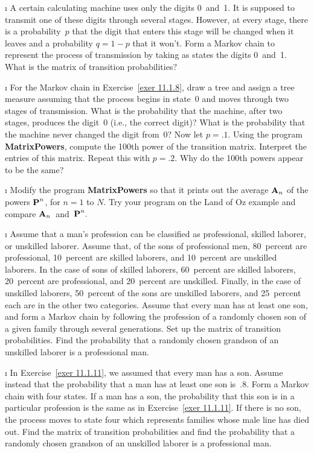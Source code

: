 \begin{LJSItem}
\i\label{exer 11.1.8} A certain calculating machine uses only the digits
0~and~1.  It is supposed to transmit one of these digits through several
stages.  However, at every stage, there is a probability~$p$ that the digit
that
enters this stage will be changed when it leaves and a probability $q = 1 - p$
that it won't.  Form a Markov chain to represent the process of transmission by
taking as states the digits 0~and~1.  What is the matrix of transition
probabilities?

\i\label{exer 11.1.9} For the Markov chain in Exercise~\ref{exer 11.1.8}, draw
a tree 
and assign a tree measure assuming that the process begins in state~0 and moves
through
two stages of transmission.  What is the probability that the machine, after
two
stages, produces the digit~0 (i.e., the correct digit)?  What is the
probability that the machine never changed the digit from~0?  Now let $p = .1$. 
Using
the program {\bf MatrixPowers}, compute the 100th power of the transition
matrix.
Interpret the entries of this matrix.  Repeat this with $p = .2$.  Why do the
100th
powers appear to be the same?

\i\label{exer 11.1.10} Modify the program {\bf MatrixPowers} so that it prints
out
the average $ {\mbox{\bf A}\/}_n$ of the powers ${\mbox{\bf P}\/}^n$, for $n = 1$ to $N$.
Try your program on the Land of Oz example and compare ${\mbox{\bf A}\/}_n$~and~${\mbox{\bf P}\/}^n.$

\i\label{exer 11.1.11} Assume that a man's profession can be classified as
professional, skilled laborer, or unskilled laborer.  Assume that, of the sons
of professional men, 80~percent are professional, 10~percent are skilled
laborers, and 10~percent are unskilled laborers.  In the case of sons of
skilled laborers, 60~percent are skilled laborers, 20~percent are professional,
and 20~percent are unskilled.  Finally, in the case of unskilled laborers,
50~percent of the sons are unskilled laborers, and 25~percent each are in the
other two categories.  Assume that every man has at least one son, and form a
Markov chain
by following the profession of a randomly chosen son of a given family through
several generations.  Set up the matrix of transition probabilities.  Find the
probability that a randomly chosen grandson of an unskilled laborer is a
professional man.

\i\label{exer 11.1.12} In Exercise~\ref{exer 11.1.11}, we assumed that every
man has 
a son.  Assume instead that the probability that a man has at least one son
is~.8.  
Form a Markov chain with four states.  If a man has a son, the probability that
this
son is in a particular profession is the same as in Exercise~\ref{exer
11.1.11}.  If
there is no son, the process moves to state four which represents families
whose male line has died out.  Find the matrix of transition probabilities and
find the probability that a randomly chosen grandson of an unskilled laborer is
a
professional man.


\end{LJSItem}
